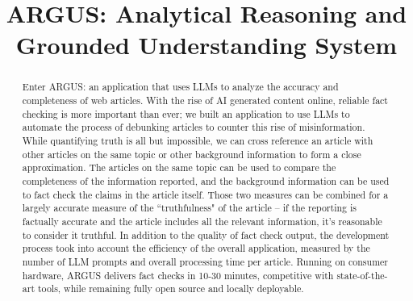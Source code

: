 \documentclass[conference]{IEEEtran}
\begin{document}
\title{ARGUS: Analytical Reasoning and Grounded Understanding System}

\author{

}

\maketitle

\begin{abstract}
Enter ARGUS: an application that uses LLMs to analyze the accuracy and completeness of web articles. With the rise of AI generated content online, reliable fact checking is more important than ever; we built an application to use LLMs to automate the process of debunking articles to counter this rise of misinformation. While quantifying truth is all but impossible, we can cross reference an article with other articles on the same topic or other background information to form a close approximation. The articles on the same topic can be used to compare the completeness of the information reported, and the background information can be used to fact check the claims in the article itself. Those two measures can be combined for a largely accurate measure of the ``truthfulness" of the article -- if the reporting is factually accurate and the article includes all the relevant information, it's reasonable to consider it truthful. In addition to the quality of fact check output, the development process took into account the efficiency of the overall application, measured by the number of LLM prompts and overall processing time per article. Running on consumer hardware, ARGUS delivers fact checks in 10-30 minutes, competitive with state-of-the-art tools, while remaining fully open source and locally deployable.
\end{abstract}
\end{document}
